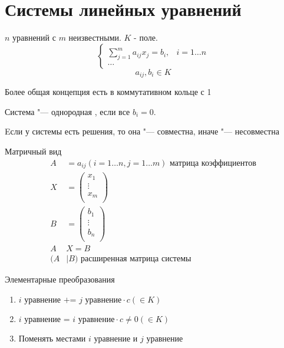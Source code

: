 \section{Системы линейных уравнений}
\begin{Def}
$n$ уравнений с $m$ неизвестными. $K$ - поле.
\[ \left\{\begin{array}{ll}
\sum_{j=1}^{m}a_{ij}x_j=b_i, &    i = 1 \dots n \\
\dots
\end{array} \right. \]
$$a_{ij}, b_i \in K$$
\end{Def}
\begin{Rem}
Более общая концепция есть в коммутативном кольце с 1
\end{Rem}
\begin{Def}
Система "--- однородная , если все $b_i=0$.
\end{Def}
\begin{Def}
Eсли у системы есть решения, то она "--- совместна, иначе "--- несовместна
\end{Def}
\begin{Def}
Матричный вид
\[\begin{aligned}
A&=a_{ij} (i=1 \dots n, j=1 \dots m) \text{  матрица коэффициентов}\\
X&= \begin{pmatrix}
				x_1\\
				\vdots\\
				x_m\\
			\end{pmatrix} \\
B&= \begin{pmatrix}
				b_1\\
				\vdots\\
				b_n\\
			\end{pmatrix} \\
A&X=B\\
(A&|B) \text{ расширенная матрица системы}
\end{aligned}\]
\end{Def}
\begin{Def}
Элементарные преобразования

\begin{enumerate}
	\item $i \text{ уравнение += }  j \text{ уравнение} \cdot c (\in K)$
	\item $i \text{ уравнение = }  i \text{ уравнение} \cdot c \neq 0(\in K)$
	\item Поменять местами $i$ уравнение и $j$ уравнение
\end{enumerate}
\end{Def}

